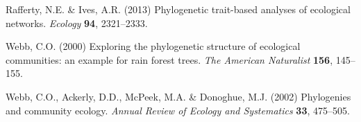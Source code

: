 \documentclass{bioinfo}
\begin{document}
\begin{thebibliography}{30}
 Rafferty, N.E. \&
  Ives, A.R. (2013) Phylogenetic trait-based analyses of ecological
  networks. \emph{Ecology} \textbf{94}, 2321--2333.

Webb, C.O. (2000) {Exploring the phylogenetic structure of ecological
  communities: an example for rain forest trees}. \emph{The American
  Naturalist} \textbf{156}, 145--155.

Webb, C.O., Ackerly, D.D., McPeek, M.A. \& Donoghue, M.J. (2002) Phylogenies
  and community ecology. \emph{Annual Review of Ecology and Systematics}
  \textbf{33}, 475--505.

\end{thebibliography}
\end{document}
